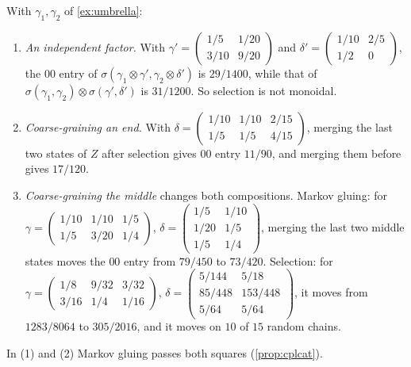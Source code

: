 \documentclass[11pt]{article}
\theoremstyle{definition}\newtheorem{definition}[theorem]{Definition}\newtheorem{remark}[theorem]{Remark}\newtheorem{example}[theorem]{Example}\newtheorem{problem}[theorem]{Open problem}\crefname{problem}{Problem}{Problems}
\begin{document}
\begin{proposition}\label{prop:selbreaks}
With $\gamma_1,\gamma_2$ of \cref{ex:umbrella}:
\begin{enumerate}
\item[(1)] \emph{An independent factor.} With $\gamma'=\left(\begin{smallmatrix}1/5&1/20\\3/10&9/20\end{smallmatrix}\right)$ and $\delta'=\left(\begin{smallmatrix}1/10&2/5\\1/2&0\end{smallmatrix}\right)$, the $00$ entry of
$\sigma(\gamma_1\otimes\gamma',\gamma_2\otimes\delta')$ is $29/1400$, while that of $\sigma(\gamma_1,\gamma_2)\otimes\sigma(\gamma',\delta')$ is $31/1200$. So selection is not monoidal.
\item[(2)] \emph{Coarse-graining an end.} With $\delta=\left(\begin{smallmatrix}1/10&1/10&2/15\\1/5&1/5&4/15\end{smallmatrix}\right)$, merging the last two states of $Z$ after selection gives $00$ entry $11/90$, and merging them
before gives $17/120$.
\item[(3)] \emph{Coarse-graining the middle} changes both compositions. Markov gluing: for $\gamma=\left(\begin{smallmatrix}1/10&1/10&1/5\\1/5&3/20&1/4\end{smallmatrix}\right)$, $\delta=\left(\begin{smallmatrix}1/5&1/10\\1/20&1/5\\1/5&1/4\end{smallmatrix}\right)$,
merging the last two middle states moves the $00$ entry from $79/450$ to $73/420$. Selection: for $\gamma=\left(\begin{smallmatrix}1/8&9/32&3/32\\3/16&1/4&1/16\end{smallmatrix}\right)$,
$\delta=\left(\begin{smallmatrix}5/144&5/18\\85/448&153/448\\5/64&5/64\end{smallmatrix}\right)$, it moves from $1283/8064$ to $305/2016$, and it moves on $10$ of $15$ random chains.
\end{enumerate}
In (1) and (2) Markov gluing passes both squares (\cref{prop:cplcat}).
\end{proposition}
\end{document}
